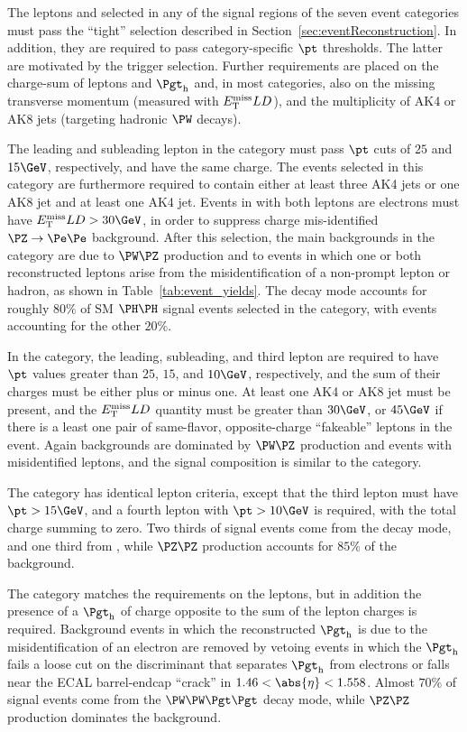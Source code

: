The leptons and \tauh selected in any of the signal regions of the seven event categories must pass the ``tight'' selection 
described in Section~\ref{sec:eventReconstruction}.
In addition, they are required to pass category-specific $\pt$ thresholds.
The latter are motivated by the trigger selection.
Further requirements are placed on the charge-sum of leptons and $\tauh$
and, in most categories, also on the missing transverse momentum (measured with $E_{\mathrm{T}}^\text{miss} LD$),
and the multiplicity of AK4 or AK8 jets (targeting hadronic $\PW$ decays). 

The leading and subleading lepton in the \llss category must pass $\pt$ cuts of $25$ and $15\GeV$, respectively,
and have the same charge.
The events selected in this category are furthermore required to contain either at least three AK4 jets or one AK8 jet and at least one AK4 jet. %
Events in with both leptons are electrons must have $\metLD > 30\GeV$, in order to suppress
charge mis-identified $\Zee$ background.
After this selection, the main backgrounds in the \llss category are due to $\PW\PZ$ production
and to events in which one or both reconstructed leptons arise from the misidentification of a non-prompt lepton or hadron,
as shown in Table~\ref{tab:event_yields}.
The \WWWW decay mode accounts for roughly $80\%$ of
SM $\HH$ signal events selected in the \llss category, with \WWtt events accounting for the other $20\%$.

In the \lllnot category, 
the leading, subleading, and third lepton are required to
have $\pt$ values greater than $25$, $15$, and $10\GeV$, respectively, and the sum of their charges must be either plus or minus one.
At least one AK4 or AK8 jet must be present, and the $E_{\mathrm{T}}^\text{miss} LD$ quantity must be greater than $30\GeV$,
or $45\GeV$ if there is a least one pair of same-flavor, opposite-charge ``fakeable''
leptons in the event.  Again backgrounds are dominated by $\PW\PZ$ production and events with misidentified
leptons, and the signal composition is similar to the \llss category.

The \llll category has identical lepton criteria, except that the third lepton
must have $\pt > 15\GeV$, and a fourth lepton with $\pt > 10\GeV$ is required, with
the total charge summing to zero.  Two thirds of signal events come from the \WWWW decay mode, 
and one third from \WWtt, while $\PZ\PZ$ production accounts for $85\%$ of the background.

The \lllt category matches the \lllnot requirements on the leptons, 
but in addition the presence of a $\tauh$ of charge opposite to the sum of the lepton charges is required.  
Background events in which the reconstructed $\tauh$ is due to the misidentification of an electron
are removed by vetoing events in which the $\tauh$ fails a loose cut on the discriminant that separates $\tauh$ from electrons
or falls near the ECAL barrel-endcap ``crack'' in $1.46 < \abs{\eta} < 1.558$.
Almost $70\%$ of signal events come from the $\WWtt$ decay mode,
while $\PZ\PZ$ production dominates the background.  

